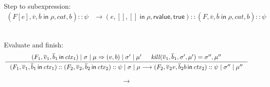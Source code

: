 \documentclass{article}
\newcommand{\IN}{\mathop{\mathsf{in}}}
\begin{document}
 \\

Step to subexpression:
\begin{align*}
  (F[e],\overline{v},\overline{b} \IN \rho, \mathit{cat}, b) :: \psi
  &\longrightarrow
  (e,[],[] \IN \rho, \mathsf{rvalue}, \mathsf{true}) :: (F,\overline{v},\overline{b} \IN  \rho, \mathit{cat}, b) :: \psi
\end{align*}

\fbox{$\psi \mid \sigma \mid \mu \longrightarrow \psi \mid \sigma \mid \mu$}\\

Evaluate and finish:
\begin{gather*}
  \inference{(F_1,\overline{v}_1,\overline{b}_1 \IN \mathit{ctx}_1) \mid \sigma \mid \mu \Rightarrow (v,b) \mid \sigma' \mid \mu'
   & \mathit{kill}(\overline{v}_1, \overline{b}_1, \sigma', \mu') = \sigma'', \mu''}
{(F_1,\overline{v}_1,\overline{b}_1 \IN \mathit{ctx}_1)
  :: (F_2,\overline{v}_2,\overline{b}_2 \IN \mathit{ctx}_2):: \psi \mid \sigma \mid \mu
  \longrightarrow
    (F_2,\overline{v}_2 v, \overline{b}_2 b \IN \mathit{ctx}_2) :: \psi \mid \sigma'' \mid \mu''}
\end{gather*}

\begin{align*}
  \longrightarrow
\end{align*}
\end{document}
